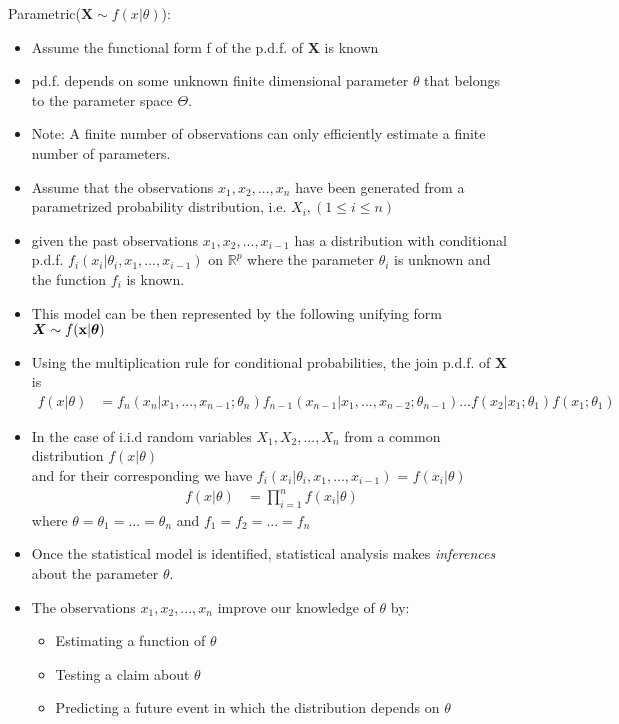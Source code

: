 \documentclass[12pt, oneside]{article}
\newcommand*{\bX}{\bm{X}}
\begin{document}
Parametric($\bX \sim f(x|\theta)$): 
\begin{itemize}
    \item Assume the functional form f of the p.d.f. of $\bX$ is known
    \item pd.f. depends on some unknown finite dimensional parameter $\theta$ that belongs to the parameter space $\Theta$. 
    \item Note: A finite number of observations can only efficiently estimate a finite number of parameters.
    \item Assume that the observations $x_1, x_2, ..., x_n$ have been generated from a parametrized probability distribution, i.e. $X_i, (1 \leq i \leq n)$
    \item given the past observations $x_1, x_2, ..., x_{i-1}$ has a distribution with conditional p.d.f. $f_i(x_i|\theta_i,x_1,...,x_{i-1})$ on $\mathbb{R}^p$ where the parameter $\theta_i$ is unknown and the function $f_i$ is known.
    \item This model can be then represented by the following unifying form $\bX \sim f(\bold{x}|\boldsymbol{\theta})$
    \item Using the multiplication rule for conditional probabilities, the join p.d.f. of $\bX$ is
    \begin{align*}
        f(x|\theta) &= f_n(x_n|x_1,...,x_{n-1};\theta_n)f_{n-1}(x_{n-1}|x_1,...,x_{n-2};\theta_{n-1})...f(x_2|x_1;\theta_1)f(x_1;\theta_1)
    \end{align*}
    \item In the case of i.i.d random variables $X_1, X_2,..., X_n$ from a common distribution $f(x|\theta)$ \\ and for their corresponding we have $f_i(x_i|\theta_i,x_1,...,x_{i-1})$ = $f(x_i|\theta)$ 
    \begin{align*}
        f(x|\theta) &= \prod^n_{i=1}f(x_i|\theta)
    \end{align*}
    where $\theta = \theta_1=...=\theta_n$ and $f_1 = f_2 = ... = f_n$
    \item Once the statistical model is identified, statistical analysis makes \emph{inferences} about the parameter $\theta$.
    \item The observations $x_1, x_2, ..., x_n$ improve our knowledge of $\theta$ by:
        \begin{itemize}
            \item Estimating a function of $\theta$
            \item Testing a claim about $\theta$
            \item Predicting a future event in which the distribution depends on $\theta$
        \end{itemize}

\end{itemize}
\end{document}
